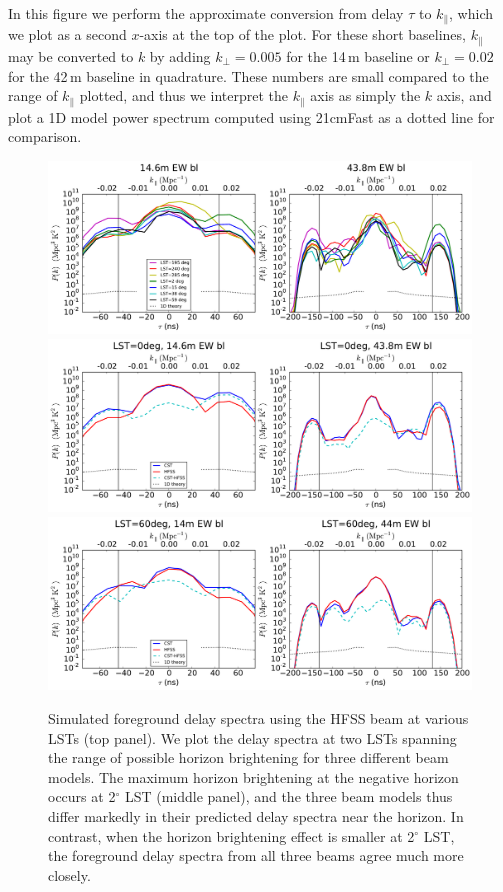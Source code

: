 \documentclass{emulateapj}
\begin{document}
In this figure we perform the approximate conversion from delay $\tau$ to $k_\parallel$, which we plot as a second $x$-axis at the top of the plot. For these short baselines, $k_\parallel$ may be converted to $k$ by adding $k_\perp=0.005$ for the 14\,m baseline or $k_\perp=0.02$ for the 42\,m baseline in quadrature. These numbers are small compared to the range of $k_\parallel$ plotted, and thus we interpret the $k_\parallel$ axis as simply the $k$ axis, and plot a 1D model power spectrum computed using 21cmFast \citep{21cmfast} as a dotted line for comparison. 

\begin{figure}[h]
\centering
\includegraphics[width=6in]{nithya_fg_pspec_all_lst.pdf}
\includegraphics[width=6in]{nithya_fg_pspec_lst0deg.pdf}
\includegraphics[width=6in]{nithya_fg_pspec_lst60deg.pdf}
\caption{Simulated foreground delay spectra using the HFSS beam at various LSTs (top panel). We plot the delay spectra at two LSTs spanning the range of possible horizon brightening for three different beam models. The maximum horizon brightening at the negative horizon occurs at 2$^\circ$ LST (middle panel), and the three beam models thus differ markedly in their predicted delay spectra near the horizon. In contrast, when the horizon brightening effect is smaller at 2$^\circ$ LST, the foreground delay spectra from all three beams agree much more closely.}
\label{fig:delayspec}
\end{figure}
\end{document}
